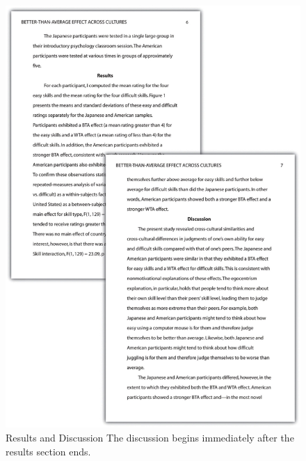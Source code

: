 \begin{figure}
\includegraphics[width=\linewidth]{figures/114}
\caption{Results and Discussion The discussion begins immediately after the results section ends.}
\label{fig:p3}
\end{figure}

